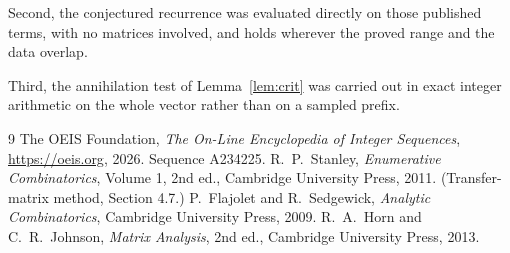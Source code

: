 \documentclass[11pt,a4paper]{article}
\theoremstyle{plain}
\theoremstyle{definition}
\begin{document}
Second, the conjectured recurrence was evaluated directly on those published terms, with no
matrices involved, and holds wherever the proved range and the data overlap.

Third, the annihilation test of Lemma~\ref{lem:crit} was carried out in exact integer
arithmetic on the whole vector rather than on a sampled prefix.

\begin{thebibliography}{9}
 The OEIS Foundation, \emph{The On-Line Encyclopedia of Integer
Sequences}, \url{https://oeis.org}, 2026. Sequence A234225.
 R.~P.~Stanley, \emph{Enumerative Combinatorics}, Volume 1, 2nd ed.,
Cambridge University Press, 2011. (Transfer-matrix method, Section 4.7.)
 P.~Flajolet and R.~Sedgewick, \emph{Analytic Combinatorics}, Cambridge
University Press, 2009.
 R.~A.~Horn and C.~R.~Johnson, \emph{Matrix Analysis}, 2nd ed., Cambridge
University Press, 2013.
\end{thebibliography}
\end{document}

